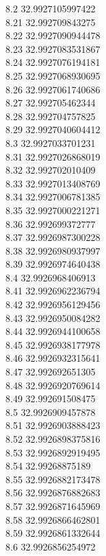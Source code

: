 {8.2	32.9927105997422\\
8.21	32.992709843275\\
8.22	32.9927090944478\\
8.23	32.9927083531867\\
8.24	32.9927076194181\\
8.25	32.9927068930695\\
8.26	32.9927061740686\\
8.27	32.992705462344\\
8.28	32.992704757825\\
8.29	32.9927040604412\\
8.3	32.9927033701231\\
8.31	32.9927026868019\\
8.32	32.992702010409\\
8.33	32.9927013408769\\
8.34	32.9927006781385\\
8.35	32.9927000221271\\
8.36	32.992699372777\\
8.37	32.9926987300228\\
8.38	32.9926980937997\\
8.39	32.9926974640438\\
8.4	32.9926968406913\\
8.41	32.9926962236794\\
8.42	32.9926956129456\\
8.43	32.9926950084282\\
8.44	32.9926944100658\\
8.45	32.9926938177978\\
8.46	32.9926932315641\\
8.47	32.992692651305\\
8.48	32.9926920769614\\
8.49	32.992691508475\\
8.5	32.9926909457878\\
8.51	32.9926903888423\\
8.52	32.9926898375816\\
8.53	32.9926892919495\\
8.54	32.99268875189\\
8.55	32.9926882173478\\
8.56	32.9926876882683\\
8.57	32.9926871645969\\
8.58	32.9926866462801\\
8.59	32.9926861332644\\
8.6	32.9926856254972\\
}
